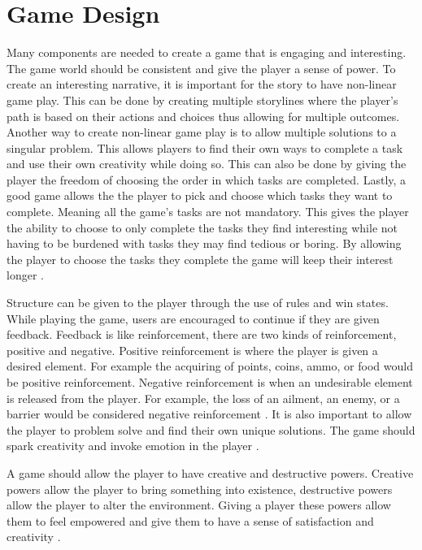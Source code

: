 \chapter{Game Design} \label{gamedesign}
Many components are needed to create a game that is engaging and interesting. The game world should be consistent and give the player a sense of power. To create an interesting narrative, it is important for the story to have non-linear game play. This can be done by creating multiple storylines where the player's path is based on their actions and choices thus allowing for multiple outcomes. Another way to create non-linear game play is to allow multiple solutions to a singular problem. This allows players to find their own ways to complete a task and use their own creativity while doing so. This can also be done by giving the player the freedom of choosing the order in which tasks are completed. Lastly, a good game allows the the player to pick and choose which tasks they want to complete. Meaning all the game's tasks are not mandatory. This gives the player the ability to choose to only complete the tasks they find interesting while not having to be burdened with tasks they may find tedious or boring. By allowing the player to choose the tasks they complete the game will keep their interest longer \cite{Iii}. 


Structure can be given to the player through the use of rules and win states. While playing the game, users are encouraged to continue if they are given feedback. Feedback is like reinforcement, there are two kinds of reinforcement, positive and negative. Positive reinforcement is where the player is given a desired element. For example the acquiring of points, coins, ammo, or food would be positive reinforcement. Negative reinforcement is when an undesirable element is released from the player. For example, the loss of an ailment, an enemy, or a barrier would be considered negative reinforcement \cite{Skinner2014}. It is also important to allow the player to problem solve and find their own unique solutions. The game should spark creativity and invoke emotion in the player \cite{Nguyen2012}. 


A game should allow the player to have creative and destructive powers. Creative powers allow the player to bring something into existence, destructive powers allow the player to alter the environment. Giving a player these powers allow them to feel empowered and give them to have a sense of satisfaction and creativity \cite{Behavior2009}.  


